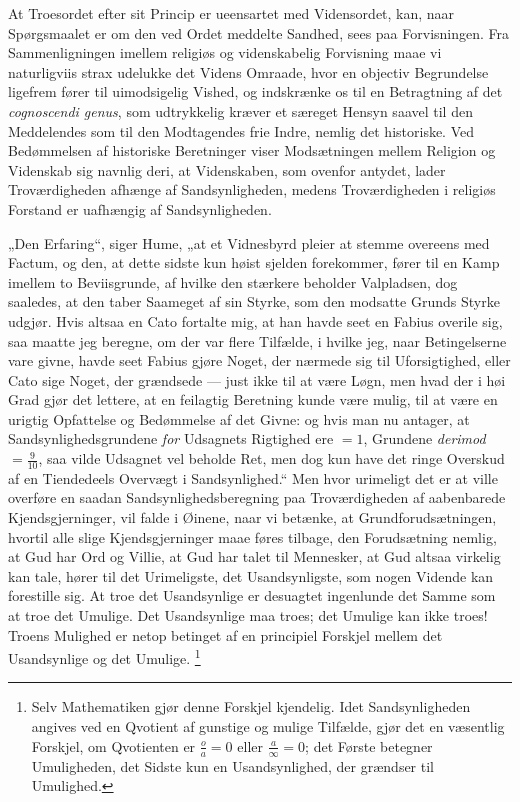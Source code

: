 \documentclass[12pt]{book}
\begin{document}
At Troesordet efter sit Princip er ueensartet med Vidensordet, kan,
naar Spørgsmaalet er om den ved Ordet meddelte Sandhed, sees paa
Forvisningen. Fra Sammenligningen imellem religiøs og videnskabelig
Forvisning maae vi naturligviis strax udelukke det Videns Omraade,
hvor en objectiv Begrundelse ligefrem fører til uimodsigelig Vished,
og indskrænke os til en Betragtning af det \textit{cognoscendi
genus}, som udtrykkelig kræver et særeget Hensyn saavel til den
Meddelendes som til den Modtagendes frie Indre, nemlig det
historiske. Ved Bedømmelsen af historiske Beretninger viser
Modsætningen mellem Religion og Videnskab sig navnlig deri, at
Videnskaben, som ovenfor antydet, lader Troværdigheden afhænge af
Sandsynligheden, medens Troværdigheden i religiøs Forstand er
uafhængig af Sandsynligheden.

„Den Erfaring“, siger Hume, „at et Vidnesbyrd pleier at stemme
overeens med Factum, og den, at dette sidste kun høist sjelden
forekommer, fører til en Kamp imellem to Beviisgrunde, af hvilke den
stærkere beholder Valpladsen, dog saaledes, at den taber Saameget af
sin Styrke, som den modsatte Grunds Styrke udgjør. Hvis altsaa en
Cato fortalte mig, at han havde seet en Fabius overile sig, saa
maatte jeg beregne, om der var flere Tilfælde, i hvilke jeg, naar
Betingelserne vare givne, havde seet Fabius gjøre Noget, der nærmede
sig til Uforsigtighed, eller Cato sige Noget, der grændsede ---
just ikke til at være Løgn, men hvad der i høi Grad gjør det
lettere, at en feilagtig Beretning kunde være mulig, til at være en
urigtig Opfattelse og Bedømmelse af det Givne: og hvis man nu
antager, at Sandsynlighedsgrundene \emph{for} Udsagnets Rigtighed
ere $= 1$, Grundene \emph{derimod} $= \frac{9}{10}$, saa vilde
Udsagnet vel beholde Ret, men dog kun have det ringe Overskud af en
Tiendedeels Overvægt i Sandsynlighed.“
Men hvor urimeligt det er at ville overføre en saadan
Sandsynlighedsberegning paa Troværdigheden af aabenbarede
Kjendsgjerninger, vil falde i Øinene, naar vi betænke, at
Grundforudsætningen, hvortil alle slige Kjendsgjerninger maae føres
tilbage, den Forudsætning nemlig, at Gud har Ord og Villie, at Gud
har talet til Mennesker, at Gud altsaa virkelig kan tale, hører til
det Urimeligste, det Usandsynligste, som nogen Vidende kan
forestille sig. At troe det Usandsynlige er desuagtet ingenlunde det
Samme som at troe det Umulige. Det Usandsynlige maa troes; det
Umulige kan ikke troes! Troens Mulighed er netop betinget af en
principiel Forskjel mellem det Usandsynlige og det
Umulige.%
\footnote{Selv Mathematiken gjør denne Forskjel kjendelig. Idet
Sandsynligheden angives ved en Qvotient af gunstige og mulige
Tilfælde, gjør det en væsentlig Forskjel, om Qvotienten er
$\frac{o}{a} = 0$ eller $\frac{a}{\infty} = 0$; det Første betegner
Umuligheden, det Sidste kun en Usandsynlighed, der grændser til
Umulighed.}
\end{document}
